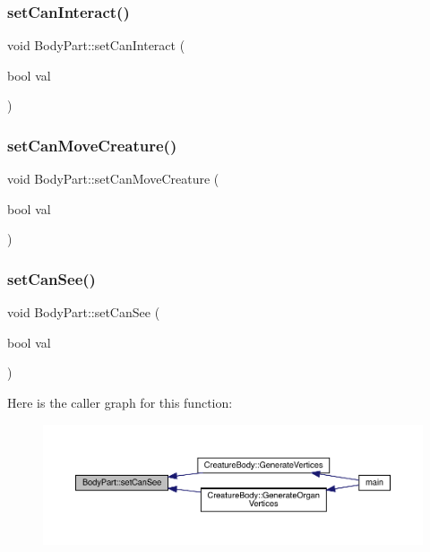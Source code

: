 \subsubsection{\texorpdfstring{set\+Can\+Interact()}{setCanInteract()}}
{\footnotesize\ttfamily void Body\+Part\+::set\+Can\+Interact (\begin{DoxyParamCaption}\item[{bool}]{val }\end{DoxyParamCaption})}

\mbox{\label{class_body_part_a8a6352fc3a764e8358f52f17caaa2867}} 
\subsubsection{\texorpdfstring{set\+Can\+Move\+Creature()}{setCanMoveCreature()}}
{\footnotesize\ttfamily void Body\+Part\+::set\+Can\+Move\+Creature (\begin{DoxyParamCaption}\item[{bool}]{val }\end{DoxyParamCaption})}

\mbox{\label{class_body_part_acc7c6792cd9837901dfb7d639714eb00}} 
\subsubsection{\texorpdfstring{set\+Can\+See()}{setCanSee()}}
{\footnotesize\ttfamily void Body\+Part\+::set\+Can\+See (\begin{DoxyParamCaption}\item[{bool}]{val }\end{DoxyParamCaption})}

Here is the caller graph for this function\+:
\nopagebreak
\begin{figure}[H]
\begin{center}
\leavevmode
\includegraphics[width=350pt]{class_body_part_acc7c6792cd9837901dfb7d639714eb00_icgraph}
\end{center}
\end{figure}
\mbox{\label{class_body_part_acc147f8434d4bf881ee4b54e1b79c439}} 
